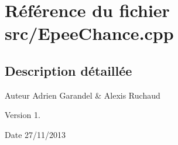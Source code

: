 \section{Référence du fichier src/\-Epee\-Chance.cpp}
\label{_epee_chance_8cpp}


\subsection{Description détaillée}
\begin{DoxyAuthor}{Auteur}
Adrien Garandel \& Alexis Ruchaud 
\end{DoxyAuthor}
\begin{DoxyVersion}{Version}
1. 
\end{DoxyVersion}
\begin{DoxyDate}{Date}
27/11/2013 
\end{DoxyDate}
